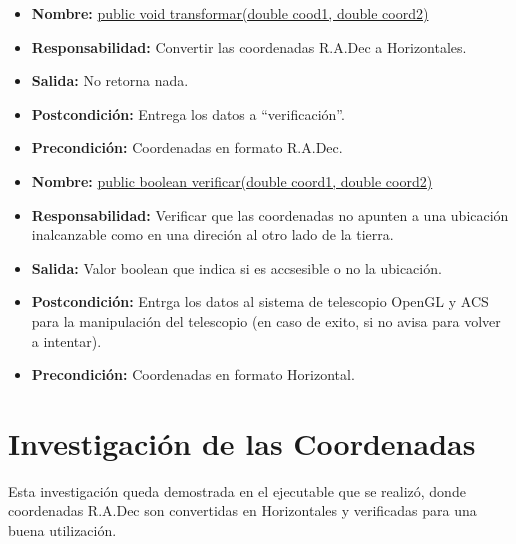 \documentclass[letterpaper,spanish,10pt]{article}
\begin{document}
\begin{itemize}
\item \textbf{Nombre:} \url{public void transformar(double cood1, double coord2)}
\item \textbf{Responsabilidad:} Convertir las coordenadas R.A.Dec a Horizontales.
\item \textbf{Salida:} No retorna nada.
\item \textbf{Postcondici\'on:} Entrega los datos a ``verificaci\'on''.
\item \textbf{Precondici\'on:} Coordenadas en formato R.A.Dec.
\end{itemize}

\begin{itemize}
\item \textbf{Nombre:} \url{public boolean verificar(double coord1, double coord2)}
\item \textbf{Responsabilidad:} Verificar que las coordenadas no apunten a una ubicaci\'on inalcanzable como en una direci\'on al otro lado de la tierra.
\item \textbf{Salida:} Valor boolean que indica si es accsesible o no la ubicaci\'on.
\item \textbf{Postcondici\'on:} Entrga los datos al sistema de telescopio OpenGL y ACS para la manipulaci\'on del telescopio (en caso de exito, si no avisa para volver a intentar).
\item \textbf{Precondici\'on:} Coordenadas en formato Horizontal.
\end{itemize}


\section{Investigaci\'on de las Coordenadas}

Esta investigaci\'on queda demostrada en el ejecutable que se realiz\'o, donde coordenadas R.A.Dec
son convertidas en Horizontales y verificadas para una buena utilizaci\'on.
\end{document}
